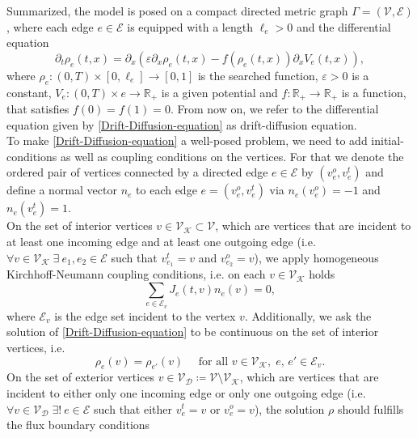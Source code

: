 Summarized, the model is posed on a compact directed metric graph $\Gamma = (\mathcal{V}, \mathcal{E})$, where each edge $e \in \mathcal{E}$ is equipped with a length $\ell_e > 0$ and the differential equation
\begin{equation} 
    \label{Drift-Diffusion-equation}
    \partial_t \rho_e (t,x) = \partial_x (\varepsilon \partial_x \rho_e (t,x) - f(\rho_e (t,x) ) \partial_x V_e (t,x)),
\end{equation}
where $\rho_e \colon (0, T) \times [0, \ell_e] \to [0, 1]$ is the searched function, $\varepsilon > 0$ is a constant, $V_e \colon (0,T) \times e \to \mathbb{R}_{+}$ is a given potential and $f \colon \mathbb{R}_{+} \to \mathbb{R}_{+}$ is a function, that satisfies $f(0) = f(1) = 0$. From now on, we refer to the differential equation given by \cref{Drift-Diffusion-equation} as drift-diffusion equation. \\
To make \cref{Drift-Diffusion-equation} a well-posed problem, we need to add initial-conditions as well as coupling conditions on the vertices. For that we denote the ordered pair of vertices connected by a directed edge $e \in \mathcal{E}$ by $(v^{o}_e, v^{t}_e)$ and define a normal vector $n_e$ to each edge $e = (v^{o}_e, v^{t}_e)$ via $n_e(v^{o}_e) = -1$ and $n_e(v^{t}_e) = 1$. \\
On the set of interior vertices $v \in \mathcal{V}_\mathcal{K} \subset \mathcal{V}$, which are vertices that are incident to at least one incoming edge and at least one outgoing edge (i.e.$\forall v \in \mathcal{V}_\mathcal{K} \; \exists \ e_1, e_2 \in \mathcal{E}$ such that $v^{t}_{e_1} = v$ and $v^{o}_{e_2} = v$), we apply homogeneous Kirchhoff-Neumann coupling conditions, i.e. on each $v \in \mathcal{V}_\mathcal{K}$ holds
\begin{equation}
    \label{eq:Kirchhoff_Neumann_condition}
    \sum_{e\in \mathcal{E}_v} J_e(t,v) n_e (v)=0,
\end{equation}
where $\mathcal{E}_v$ is the edge set incident to the vertex $v$. Additionally, we ask the solution of \cref{Drift-Diffusion-equation} to be continuous on the set of interior vertices, i.e. 
\begin{equation}
    \label{continuous on vertices}
    \rho_e(v) = \rho_{e'}(v) \quad \text{ for all }v \in \mathcal{V}_\mathcal{K},\; e,\,e' \in \mathcal{E}_v.
\end{equation}
On the set of exterior vertices $v \in \mathcal{V}_\mathcal{D} \coloneqq \mathcal{V} \setminus \mathcal{V}_\mathcal{K}$, which are vertices that are incident to either only one incoming edge or only one outgoing edge (i.e. $\forall v \in \mathcal{V}_\mathcal{D} \; \exists! \ e \in \mathcal{E}$ such that either $v^{t}_{e} = v$ or $v^{o}_{e} = v$), the solution $\rho$ should fulfills the flux boundary conditions

